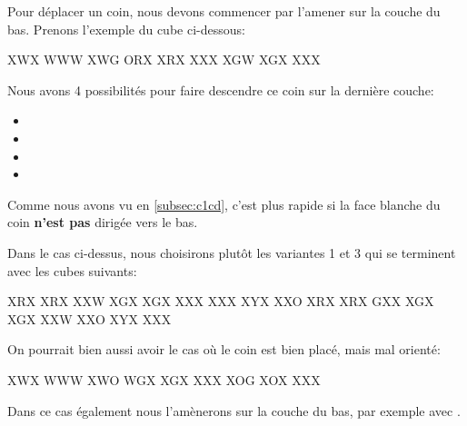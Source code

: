 Pour déplacer un coin, nous devons commencer par l'amener sur la couche du bas. Prenons l'exemple du cube ci-dessous:

\begin{center}
	\RubikFaceUp%
	{X}{W}{X}%
	{W}{W}{W}%
	{X}{W}{G}
	\RubikFaceRight%
	{O}{R}{X}%
	{X}{R}{X}%
	{X}{X}{X}
	\RubikFaceFront%
	{X}{G}{W}%
	{X}{G}{X}%
	{X}{X}{X}
\end{center}

Nous avons 4 possibilités pour faire descendre ce coin sur la dernière couche:

\begin{itemize}
	\item {}
	\item {}
	\item {}
	\item {}		
\end{itemize}

Comme nous avons vu en \ref{subsec:c1cd}, c'est plus rapide si la face blanche du coin \textbf{n'est pas} dirigée vers le bas.

\begin{samepage}
Dans le cas ci-dessus, nous choisirons plutôt les variantes 1 et 3 qui se terminent avec les cubes suivants:

\begin{center}	
	\RubikFaceRight%
	{X}{R}{X}%
	{X}{R}{X}%
	{X}{X}{W}
	\RubikFaceFront%
	{X}{G}{X}%
	{X}{G}{X}%
	{X}{X}{X}
	\RubikFaceDown%
	{X}{X}{X}%
	{X}{Y}{X}%
	{X}{X}{O}
	\hspace*{1cm} 	
	\RubikFaceRight%
	{X}{R}{X}%
	{X}{R}{X}%
	{G}{X}{X}
	\RubikFaceFront%
	{X}{G}{X}%
	{X}{G}{X}%
	{X}{X}{W}
	\RubikFaceDown%
	{X}{X}{O}%
	{X}{Y}{X}%
	{X}{X}{X}
\end{center} 
\end{samepage}
	
On pourrait bien aussi avoir le cas où le coin est bien placé, mais mal orienté:

\begin{center}
	\RubikFaceUp%
	{X}{W}{X}%
	{W}{W}{W}%
	{X}{W}{O}
	\RubikFaceRight%
	{W}{G}{X}%
	{X}{G}{X}%
	{X}{X}{X}
	\RubikFaceFront%
	{X}{O}{G}%
	{X}{O}{X}%
	{X}{X}{X}
\end{center}

Dans ce cas également nous l'amènerons sur la couche du bas, par exemple avec .
 
